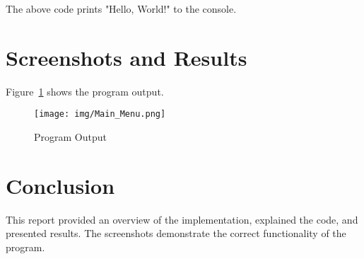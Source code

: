 \documentclass[a4paper,12pt]{article}
\begin{document}
The above code prints "Hello, World!" to the console.

\section{Screenshots and Results}
Figure~\ref{fig:screenshot} shows the program output.

\begin{figure}[h!]
    \centering
    \texttt{[image: img/Main\_Menu.png]}
    \caption{Program Output}
    \label{fig:screenshot}
\end{figure}

\section{Conclusion}
This report provided an overview of the implementation, explained the code, and presented results. The screenshots demonstrate the correct functionality of the program.
\end{document}

